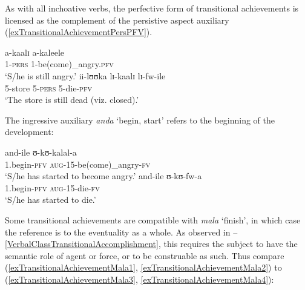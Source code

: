 \begin{exe}
\ex \label{exTransitionalAchievementPERSPRS}\begin{xlist}
\end{xlist}
\end{exe}

As with all inchoative verbs, the perfective form of transitional achievements is licensed as the complement of the persistive aspect auxiliary (\ref{exTransitionalAchievementPersPFV}).
\begin{exe}
\ex \label{exTransitionalAchievementPersPFV}\begin{xlist}
\ex\gll a-kaalɪ a-kaleele\\
1-\textsc{pers} 1-be(come)\_angry.\textsc{pfv}\\
\glt `S/he is still angry.'
\ex \gll ii-lʊʊka lɪ-kaalɪ lɪ-fw-ile\\
5-store 5-\textsc{pers} 5-die-\textsc{pfv}\\
\glt `The store is still dead (viz. closed).'
\end{xlist}
\end{exe}

The ingressive auxiliary \textit{anda} `begin, start' refers to the beginning of the development:
\begin{exe}
\ex \begin{xlist}
\ex \gll and-ile ʊ-kʊ-kalal-a\\
1.begin-\textsc{pfv} \textsc{aug}-15-be(come)\_angry-\textsc{fv}\\
\glt `S/he has started to become angry.'
\ex \gll and-ile ʊ-kʊ-fw-a\\
1.begin-\textsc{pfv} \textsc{aug}-15-die-\textsc{fv}\\
\glt `S/he has started to die.'
\end{xlist}
\end{exe}
Some transitional achievements are compatible with \textit{mala} \lq finish', in which case the reference is to the eventuality as a whole. As observed in --\ref{VerbalClassTransitionalAccomplishment}, this requires the subject to have the semantic role of agent or force, or to be construable as such. Thus compare (\ref{exTransitionalAchievementMala1}, \ref{exTransitionalAchievementMala2}) to (\ref{exTransitionalAchievementMala3}, \ref{exTransitionalAchievementMala4}):


